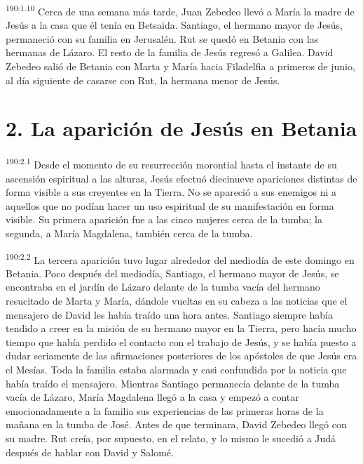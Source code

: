 \par 
\textsuperscript{190:1.10} Cerca de una semana más tarde, Juan Zebedeo llevó a María la madre de Jesús a la casa que él tenía en Betsaida. Santiago, el hermano mayor de Jesús, permaneció con su familia en Jerusalén. Rut se quedó en Betania con las hermanas de Lázaro. El resto de la familia de Jesús regresó a Galilea. David Zebedeo salió de Betania con Marta y María hacia Filadelfia a primeros de junio, al día siguiente de casarse con Rut, la hermana menor de Jesús.

\section*{2. La aparición de Jesús en Betania}
\par 
\textsuperscript{190:2.1} Desde el momento de su resurrección morontial hasta el instante de su ascensión espiritual a las alturas, Jesús efectuó diecinueve apariciones distintas de forma visible a sus creyentes en la Tierra. No se apareció a sus enemigos ni a aquellos que no podían hacer un uso espiritual de su manifestación en forma visible. Su primera aparición fue a las cinco mujeres cerca de la tumba; la segunda, a María Magdalena, también cerca de la tumba.

\par 
\textsuperscript{190:2.2} La tercera aparición tuvo lugar alrededor del mediodía de este domingo en Betania. Poco después del mediodía, Santiago, el hermano mayor de Jesús, se encontraba en el jardín de Lázaro delante de la tumba vacía del hermano resucitado de Marta y María, dándole vueltas en su cabeza a las noticias que el mensajero de David les había traído una hora antes. Santiago siempre había tendido a creer en la misión de su hermano mayor en la Tierra, pero hacía mucho tiempo que había perdido el contacto con el trabajo de Jesús, y se había puesto a dudar seriamente de las afirmaciones posteriores de los apóstoles de que Jesús era el Mesías. Toda la familia estaba alarmada y casi confundida por la noticia que había traído el mensajero. Mientras Santiago permanecía delante de la tumba vacía de Lázaro, María Magdalena llegó a la casa y empezó a contar emocionadamente a la familia sus experiencias de las primeras horas de la mañana en la tumba de José. Antes de que terminara, David Zebedeo llegó con su madre. Rut creía, por supuesto, en el relato, y lo mismo le sucedió a Judá después de hablar con David y Salomé.

